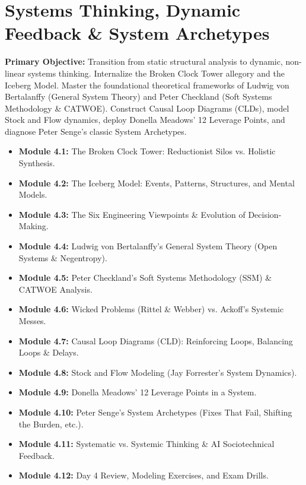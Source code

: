 \chapter{Systems Thinking, Dynamic Feedback \& System Archetypes}
\label{chap:day4}

\begin{tcolorbox}[colback=sePrimary!5!white,colframe=sePrimary,title={\sffamily \textbf{DAY 4 CURRICULUM OVERVIEW \& LEARNING TARGETS}}]
\small
\textbf{Primary Objective:} Transition from static structural analysis to dynamic, non-linear systems thinking. Internalize the Broken Clock Tower allegory and the Iceberg Model. Master the foundational theoretical frameworks of Ludwig von Bertalanffy (General System Theory) and Peter Checkland (Soft Systems Methodology \& CATWOE). Construct Causal Loop Diagrams (CLDs), model Stock and Flow dynamics, deploy Donella Meadows' 12 Leverage Points, and diagnose Peter Senge's classic System Archetypes.
\begin{itemize}[leftmargin=1.5em, itemsep=2pt]
    \item \textbf{Module 4.1:} The Broken Clock Tower: Reductionist Silos vs. Holistic Synthesis.
    \item \textbf{Module 4.2:} The Iceberg Model: Events, Patterns, Structures, and Mental Models.
    \item \textbf{Module 4.3:} The Six Engineering Viewpoints \& Evolution of Decision-Making.
    \item \textbf{Module 4.4:} Ludwig von Bertalanffy's General System Theory (Open Systems \& Negentropy).
    \item \textbf{Module 4.5:} Peter Checkland's Soft Systems Methodology (SSM) \& CATWOE Analysis.
    \item \textbf{Module 4.6:} Wicked Problems (Rittel \& Webber) vs. Ackoff's Systemic Messes.
    \item \textbf{Module 4.7:} Causal Loop Diagrams (CLD): Reinforcing Loops, Balancing Loops \& Delays.
    \item \textbf{Module 4.8:} Stock and Flow Modeling (Jay Forrester's System Dynamics).
    \item \textbf{Module 4.9:} Donella Meadows' 12 Leverage Points in a System.
    \item \textbf{Module 4.10:} Peter Senge's System Archetypes (Fixes That Fail, Shifting the Burden, etc.).
    \item \textbf{Module 4.11:} Systematic vs. Systemic Thinking \& AI Sociotechnical Feedback.
    \item \textbf{Module 4.12:} Day 4 Review, Modeling Exercises, and Exam Drills.
\end{itemize}
\end{tcolorbox}

